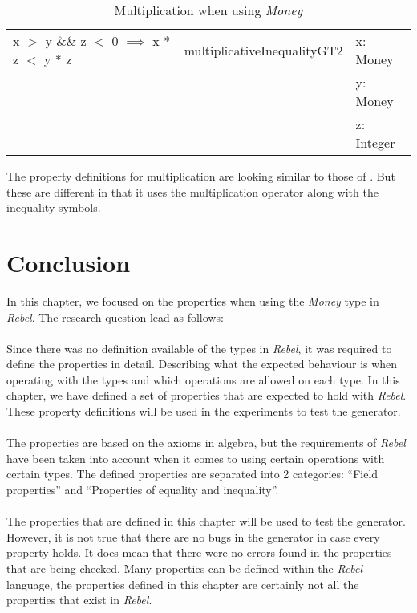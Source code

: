 \begin{table}[!ht]
\begin{tabular}{lll}
\rowcolor[HTML]{EFEFEF} x $>$ y \&\& z $<$ 0 $\implies$ x * z $<$ y * z & multiplicativeInequalityGT2 & x: Money                 \\
\rowcolor[HTML]{EFEFEF}                                                 &                             & y: Money                 \\
\rowcolor[HTML]{EFEFEF}                                                 &                             & z: Integer               \\ \hline
\end{tabular}
\caption{Multiplication when using \textit{Money}}
\label{tbl:properties_money_multiplication_updated}
\end{table}
\FloatBarrier\noindent
The property definitions for multiplication are looking similar to those of
. But these are different in that it
uses the multiplication operator along with the inequality symbols.

\section{Conclusion}
In this chapter, we focused on the properties when using the \textit{Money}
type in \textit{Rebel}. The research question lead as follows:\rqOne\\
\\
Since there was no definition available of the types in \textit{Rebel}, it was
required to define the properties in detail. Describing what the expected
behaviour is when operating with the types and which operations are allowed on
each type. In this chapter, we have defined a set of properties that are
expected to hold with \textit{Rebel}. These property definitions will be used in the experiments to test the generator.\\
\\
The properties are based on the axioms in algebra, but the requirements of
\textit{Rebel} have been taken into account when it comes to using certain
operations with certain types. The defined properties are separated into 2
categories: ``Field properties'' and ``Properties of equality and inequality''.
\\
\\
The properties that are defined in this chapter will be used to test the
generator. However, it is not true that there are no bugs in the generator in
case every property holds. It does mean that there were no errors found in the
properties that are being checked. Many properties can be defined within the
\textit{Rebel} language, the properties defined in this chapter are certainly
not all the properties that exist in \textit{Rebel}.

